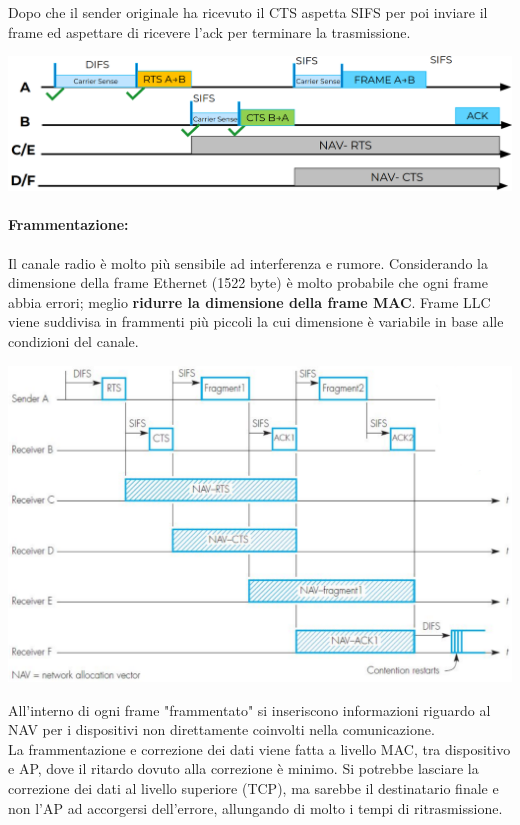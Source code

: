 Dopo che il sender originale ha ricevuto il CTS aspetta SIFS per poi inviare il frame ed aspettare di ricevere l'ack per terminare la trasmissione.
\begin{center}
	\includegraphics[width=0.98\linewidth]{img/wlan/rtscts}
\end{center}

\paragraph{Frammentazione:} Il canale radio è molto più sensibile ad interferenza e rumore. Considerando la dimensione della frame Ethernet (1522 byte) è molto probabile che ogni frame abbia errori; meglio \textbf{ridurre la dimensione della frame MAC}. Frame LLC viene suddivisa in frammenti più piccoli la cui dimensione è variabile in base alle condizioni del canale.
\begin{center}
	\includegraphics[width=0.9\linewidth]{img/wlan/frag}
\end{center}
All'interno di ogni frame "frammentato" si inseriscono informazioni riguardo al NAV per i dispositivi non direttamente coinvolti nella comunicazione.\\

La frammentazione e correzione dei dati viene fatta a livello MAC, tra dispositivo e AP, dove il ritardo dovuto alla correzione è minimo. Si potrebbe lasciare la correzione dei dati al livello superiore (TCP), ma sarebbe il destinatario finale e non l'AP ad accorgersi dell'errore, allungando di molto i tempi di ritrasmissione.\\


